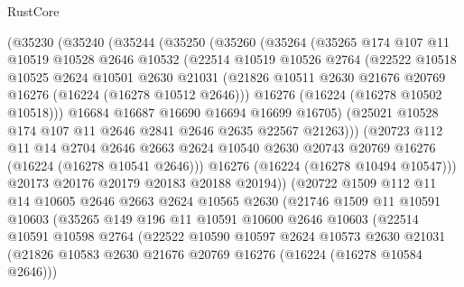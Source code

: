 \begin{lexlean}{RustCore}
\begin{coremodule}
        (@35230
          (@35240
            (@35244
              (@35250
                (@35260
                  (@35264
                    (@35265
                      @174
                      @107
                      @11
                      @10519
                      @10528
                      @2646
                      @10532
                      (@22514
                        @10519
                        @10526
                        @2764
                        (@22522
                          @10518
                          @10525
                          @2624
                          @10501
                          @2630
                          @21031
                          (@21826 @10511 @2630 @21676 @20769 @16276 (@16224 (@16278 @10512 @2646)))
                          @16276
                          (@16224 (@16278 @10502 @10518)))
                        @16684
                        @16687
                        @16690
                        @16694
                        @16699
                        @16705)
                      (@25021 @10528 @174 @107 @11 @2646 @2841 @2646 @2635 @22567 @21263)))
                  (@20723
                    @112
                    @11
                    @14
                    @2704
                    @2646
                    @2663
                    @2624
                    @10540
                    @2630
                    @20743
                    @20769
                    @16276
                    (@16224 (@16278 @10541 @2646)))
                  @16276
                  (@16224 (@16278 @10494 @10547)))
                @20173
                @20176
                @20179
                @20183
                @20188
                @20194))
            (@20722
              @1509
              @112
              @11
              @14
              @10605
              @2646
              @2663
              @2624
              @10565
              @2630
              (@21746
                @1509
                @11
                @10591
                @10603
                (@35265
                  @149
                  @196
                  @11
                  @10591
                  @10600
                  @2646
                  @10603
                  (@22514
                    @10591
                    @10598
                    @2764
                    (@22522
                      @10590
                      @10597
                      @2624
                      @10573
                      @2630
                      @21031
                      (@21826 @10583 @2630 @21676 @20769 @16276 (@16224 (@16278 @10584 @2646)))

\end{coremodule}
\end{lexlean}
